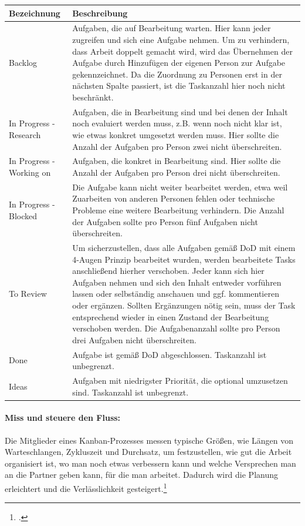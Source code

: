 \begin{minipage}{\textwidth}
\begin{center}
\begin{tabular}{p{2.5cm}p{13cm}}
\toprule
Bezeichnung & Beschreibung \\
\midrule
Backlog & Aufgaben, die auf Bearbeitung warten. Hier kann jeder zugreifen und sich eine Aufgabe nehmen. Um zu verhindern, dass Arbeit doppelt gemacht wird, wird das Übernehmen der Aufgabe durch Hinzufügen der eigenen Person zur Aufgabe gekennzeichnet. Da die Zuordnung zu Personen erst in der nächsten Spalte passiert, ist die Taskanzahl hier noch nicht beschränkt. \\
In Progress - Research & Aufgaben, die in Bearbeitung sind und bei denen der Inhalt noch evaluiert werden muss, z.B. wenn noch nicht klar ist, wie etwas konkret umgesetzt werden muss. Hier sollte die Anzahl der Aufgaben pro Person zwei nicht überschreiten. \\
In Progress - Working on & Aufgaben, die konkret in Bearbeitung sind. Hier sollte die Anzahl der Aufgaben pro Person drei nicht überschreiten. \\
In Progress - Blocked & Die Aufgabe kann nicht weiter bearbeitet werden, etwa weil Zuarbeiten von anderen Personen fehlen oder technische Probleme eine weitere Bearbeitung verhindern. Die Anzahl der Aufgaben sollte pro Person fünf Aufgaben nicht überschreiten. \\
To Review & Um sicherzustellen, dass alle Aufgaben gemäß DoD mit einem 4-Augen Prinzip bearbeitet wurden, werden bearbeitete Tasks anschließend hierher verschoben. Jeder kann sich hier Aufgaben nehmen und sich den Inhalt entweder vorführen lassen oder selbständig anschauen und ggf. kommentieren oder ergänzen. Sollten Ergänzungen nötig sein, muss der Task entsprechend wieder in einen Zustand der Bearbeitung verschoben werden. Die Aufgabenanzahl sollte pro Person drei Aufgaben nicht überschreiten. \\
Done & Aufgabe ist gemäß DoD abgeschlossen. Taskanzahl ist unbegrenzt. \\
Ideas & Aufgaben mit niedrigster Priorität, die optional umzusetzen sind. Taskanzahl ist unbegrenzt. \\
\bottomrule
\end{tabular}
\end{center}
\end{minipage}

\paragraph{Miss und steuere den Fluss:} Die Mitglieder eines Kanban-Prozesses
messen typische Größen, wie Längen von Warteschlangen, Zykluszeit und Durchsatz,
um festzustellen, wie gut die Arbeit organisiert ist, wo man noch etwas
verbessern kann und welche Versprechen man an die Partner geben kann, für die
man arbeitet. Dadurch wird die Planung erleichtert und die Verlässlichkeit
gesteigert.\footcite{wikiKanban}

